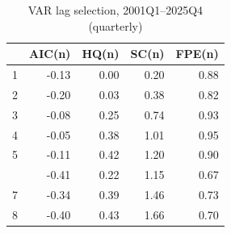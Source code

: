 \begin{table}

\caption{\label{tab:tbl-var-select-q}VAR lag selection, 2001Q1--2025Q4 (quarterly)}
\centering
\begin{tabular}[t]{lrrrr}
\toprule
  & AIC(n) & HQ(n) & SC(n) & FPE(n)\\
\midrule
1 & -0.13 & 0.00 & 0.20 & 0.88\\
2 & -0.20 & 0.03 & 0.38 & 0.82\\
3 & -0.08 & 0.25 & 0.74 & 0.93\\
4 & -0.05 & 0.38 & 1.01 & 0.95\\
5 & -0.11 & 0.42 & 1.20 & 0.90\\
\addlinespace
6 & -0.41 & 0.22 & 1.15 & 0.67\\
7 & -0.34 & 0.39 & 1.46 & 0.73\\
8 & -0.40 & 0.43 & 1.66 & 0.70\\
\bottomrule
\end{tabular}
\end{table}
